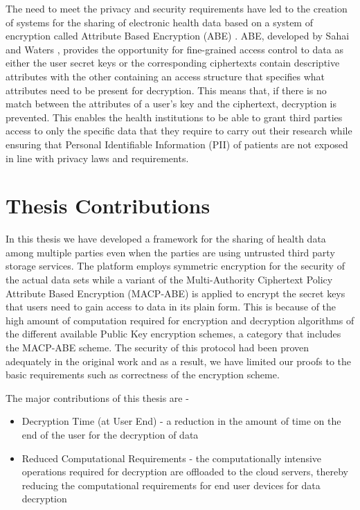 The need to meet the privacy and security requirements have led to the creation of systems for the sharing of electronic health data based on a system of encryption called Attribute Based Encryption (ABE) \cite{Ibraimi2010}\cite{Narayan2010}\cite{Akinyele2010}\cite{Barua2011}\cite{Alshehri}\cite{Hupperich2012}\cite{Hsieh2012}\cite{Li2013}. ABE, developed by Sahai and Waters \cite{Sahai2005}, provides the opportunity for fine-grained access control to data as either the user secret keys or the corresponding ciphertexts contain descriptive attributes with the other containing an access structure that specifies what attributes need to be present for decryption. This means that, if there is no match between the attributes of a user's key and the ciphertext, decryption is prevented. This enables the health institutions to be able to grant third parties access to only the specific data that they require to carry out their research while ensuring that Personal Identifiable Information (PII) of patients are not exposed in line with privacy laws and requirements.


\section{Thesis Contributions}

In this thesis we have developed a framework for the sharing of health data among multiple parties even when the parties are using untrusted third party storage services. The platform employs symmetric encryption for the security of the actual data sets while a variant of the Multi-Authority Ciphertext Policy Attribute Based Encryption (MACP-ABE) is applied to encrypt the secret keys that users need to gain access to data in its plain form. This is because of the high amount of computation required for encryption and decryption algorithms of the different available Public Key encryption schemes, a category that includes the MACP-ABE scheme. The security of this protocol had been proven adequately in the original work \cite{Yang2014} and as a result, we have limited our proofs to the basic requirements such as correctness of the encryption scheme.

The major contributions of this thesis are - 

\begin{itemize}
	
	\item Decryption Time (at User End) - a reduction in the amount of time on the end of the user for the decryption of data
	
	\item Reduced Computational Requirements - the computationally intensive operations required for decryption are offloaded to the cloud servers, thereby reducing the computational requirements for end user devices for data decryption
	
\end{itemize}

